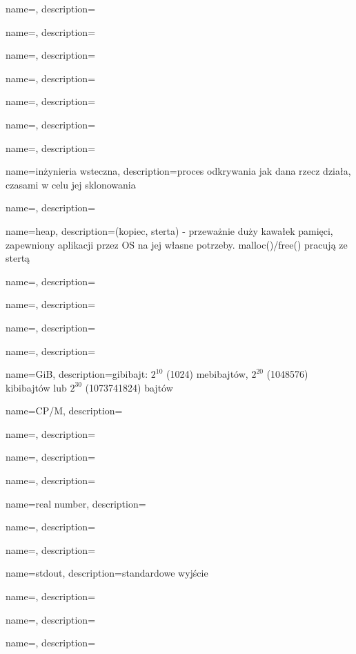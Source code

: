 {
  name={\PLph},
  description={\PLph}
}

{
  name={\PLph},
  description={\PLph}
}

{
  name={\PLph},
  description={\PLph}
}

{
  name={\PLph},
  description={\PLph}
}

{
  name={\PLph},
  description={\PLph}
}

{
  name={\PLph},
  description={\PLph}
}

{
  name={\PLph},
  description={\PLph}
}

{
  name={inżynieria wsteczna},
  description={proces odkrywania jak dana rzecz działa, czasami w celu jej sklonowania}
}

{
  name={\PLph},
  description={\PLph}
}

{
  name={heap},
  description={(kopiec, sterta) - przeważnie duży kawałek pamięci, zapewniony aplikacji przez \ac{OS} na jej własne potrzeby. malloc()/free() pracują ze stertą}
}

{
  name={\PLph},
  description={\PLph}
}

{
  name={\PLph},
  description={\PLph}
}

{
  name={\PLph},
  description={\PLph}
}

{
  name={\PLph},
  description={\PLph}
}

{
  name=GiB,
  description={gibibajt: $2^{10}$ (1024) mebibajtów, $2^{20}$ (1048576) kibibajtów lub $2^{30}$ (1073741824) bajtów}
}

{
  name=CP/M,
  description={\PLph}
}

{
  name={\PLph},
  description={\PLph}
}

{
  name={\PLph},
  description={\PLph}
}

{
  name={\PLph},
  description={\PLph}
}

{
  name={real number},
  description={\PLph}
}

{
  name={\PLph},
  description={\PLph}
}

{
  name={\PLph},
  description={\PLph}
}

{
  name={stdout},
  description={standardowe wyjście}
}

{
  name={\PLph},
  description={\PLph}
}

{
  name={\PLph},
  description={\PLph}
}

{
  name={\PLph},
  description={\PLph}
}

